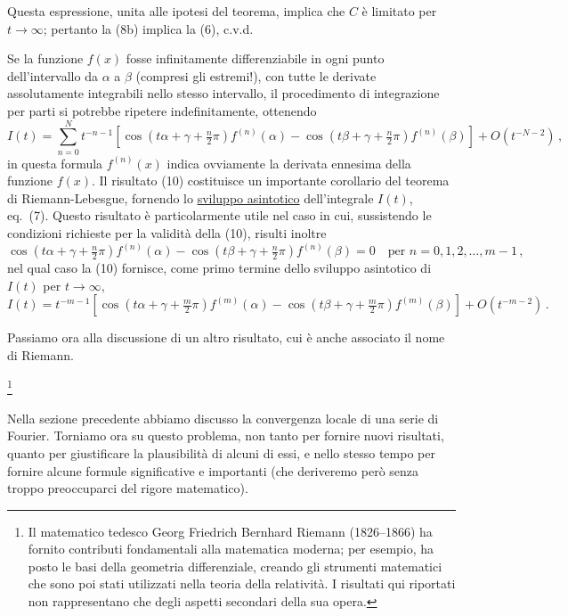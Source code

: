 \documentclass[11pt, a4paper]{book}
\numberwithin{equation}{section}
\begin{document}
Questa espressione, unita alle ipotesi del teorema, implica che $C$ è limitato per $t\to\infty$; pertanto la (8b) implica la (6), c.v.d.

Se la funzione $f(x)$ fosse infinitamente differenziabile in ogni punto dell'intervallo da $\alpha$ a $\beta$ (compresi gli estremi!), con tutte le derivate assolutamente integrabili nello stesso intervallo, il procedimento di integrazione per parti si potrebbe ripetere indefinitamente, ottenendo
\begin{equation}
  I(t) = \sum_{n=0}^{N} t^{-n-1}\left[\cos\!\left(t\alpha+\gamma+\tfrac{n}{2}\pi\right)f^{(n)}(\alpha)
  - \cos\!\left(t\beta+\gamma+\tfrac{n}{2}\pi\right)f^{(n)}(\beta)\right]
  + O\!\left(t^{-N-2}\right)\,, \tag{10}
\end{equation}
in questa formula $f^{(n)}(x)$ indica ovviamente la derivata ennesima della funzione $f(x)$. Il risultato (10) costituisce un importante corollario del teorema di Riemann-Lebesgue, fornendo lo \uline{sviluppo asintotico} dell'integrale $I(t)$, eq.\ (7). Questo risultato è particolarmente utile nel caso in cui, sussistendo le condizioni richieste per la validità della (10), risulti inoltre
\begin{equation}
  \cos\!\left(t\alpha+\gamma+\tfrac{n}{2}\pi\right)f^{(n)}(\alpha)
  - \cos\!\left(t\beta+\gamma+\tfrac{n}{2}\pi\right)f^{(n)}(\beta) = 0
  \quad\text{per } n=0,1,2,\ldots,m-1\,, \tag{11}
\end{equation}
nel qual caso la (10) fornisce, come primo termine dello sviluppo asintotico di $I(t)$ per $t\to\infty$,
\begin{equation}
  I(t) = t^{-m-1}\left[\cos\!\left(t\alpha+\gamma+\tfrac{m}{2}\pi\right)f^{(m)}(\alpha)
  - \cos\!\left(t\beta+\gamma+\tfrac{m}{2}\pi\right)f^{(m)}(\beta)\right]
  + O\!\left(t^{-m-2}\right)\,. \tag{12}
\end{equation}

Passiamo ora alla discussione di un altro risultato, cui è anche associato il nome di Riemann.

\footnote{Il matematico tedesco Georg Friedrich Bernhard Riemann (1826--1866) ha fornito contributi fondamentali alla matematica moderna; per esempio, ha posto le basi della geometria differenziale, creando gli strumenti matematici che sono poi stati utilizzati nella teoria della relatività. I risultati qui riportati non rappresentano che degli aspetti secondari della sua opera.}



Nella sezione precedente abbiamo discusso la convergenza locale di una serie di Fourier. Torniamo ora su questo problema, non tanto per fornire nuovi risultati, quanto per giustificare la plausibilità di alcuni di essi, e nello stesso tempo per fornire alcune formule significative e importanti (che deriveremo però senza troppo preoccuparci del rigore matematico).
\end{document}
